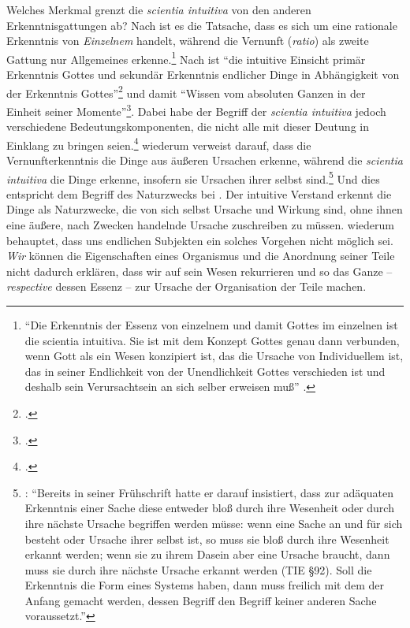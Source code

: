 Welches Merkmal grenzt die \emph{scientia intuitiva} von den anderen
Erkenntnisgattungen ab? Nach
 ist es die Tatsache,
dass es sich um eine rationale Erkenntnis von \emph{Einzelnem} handelt, während
die Vernunft (\emph{ratio}) als zweite Gattung nur Allgemeines
erkenne.\footnote{\enquote{Die Erkenntnis der Essenz von einzelnem und damit
Gottes im einzelnen ist die scientia intuitiva. Sie ist mit dem Konzept Gottes
genau dann verbunden, wenn Gott als ein Wesen konzipiert ist, das die Ursache
von Individuellem ist, das in seiner Endlichkeit von der Unendlichkeit Gottes
verschieden ist und deshalb sein Verursachtsein an sich selber erweisen muß}
\parencite[][121]{Bartuschat:SpinozasTheoriedesMenschen1992}.} Nach
ist \enquote{die intuitive Einsicht primär Erkenntnis Gottes und sekundär
Erkenntnis endlicher Dinge in Abhängigkeit von der Erkenntnis
Gottes}\footcite[][\pno~497\,f.]{Roed:SpinozasIdeederScientiaintuitivaunddieSpinozanischeWissenschaftskonzeption1977}
und damit \enquote{Wissen vom absoluten Ganzen in der Einheit seiner
Momente}\footcite[][498]{Roed:SpinozasIdeederScientiaintuitivaunddieSpinozanischeWissenschaftskonzeption1977}.
Dabei habe der Begriff der \emph{scientia intuitiva} jedoch verschiedene
Bedeutungskomponenten, die nicht alle mit dieser Deutung in Einklang zu bringen
seien.\footcite[Vgl.][498]{Roed:SpinozasIdeederScientiaintuitivaunddieSpinozanischeWissenschaftskonzeption1977}
 wiederum verweist darauf,
dass die Vernunfterkenntnis die Dinge aus äußeren Ursachen erkenne, während die
\emph{scientia intuitiva} die Dinge erkenne, insofern sie Ursachen ihrer selbst
sind.\footnote{\cite[Siehe][91]{Foerster:Die25JahrederPhilosophie2011}:
\enquote{Bereits in seiner Frühschrift  hatte er
darauf insistiert, dass zur adäquaten Erkenntnis einer Sache diese entweder bloß
durch ihre Wesenheit oder durch ihre nächste Ursache begriffen werden müsse:
wenn eine Sache an und für sich besteht oder Ursache ihrer selbst ist, so muss
sie bloß durch ihre Wesenheit erkannt werden; wenn sie zu ihrem Dasein aber eine
Ursache braucht, dann muss sie durch ihre nächste Ursache erkannt werden (TIE
§92). Soll die Erkenntnis die Form eines Systems haben, dann muss freilich mit
dem der Anfang gemacht werden, dessen Begriff den Begriff keiner anderen Sache
voraussetzt.}} Und dies entspricht dem Begriff des Naturzwecks
bei . Der intuitive Verstand erkennt die Dinge als
Naturzwecke, die von sich selbst Ursache und Wirkung sind, ohne ihnen eine
äußere, nach Zwecken handelnde Ursache zuschreiben zu
müssen.  wiederum behauptet, dass uns endlichen
Subjekten ein solches Vorgehen nicht möglich sei. \emph{Wir} können
die Eigenschaften eines Organismus und die Anordnung seiner Teile
nicht dadurch erklären, dass wir auf sein Wesen rekurrieren und so das
Ganze -- \emph{respective} dessen Essenz -- zur Ursache der Organisation der Teile machen.

